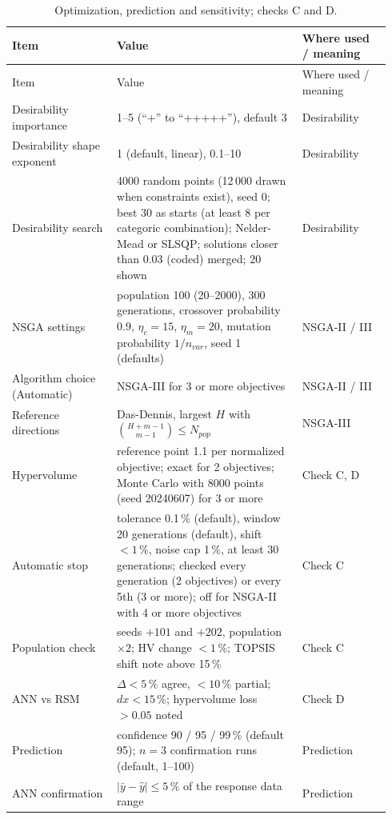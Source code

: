 {\small\begin{longtable}{@{}p{0.26\linewidth}p{0.46\linewidth}p{0.22\linewidth}@{}}
\caption{Optimization, prediction and sensitivity; checks C and D.}\label{tab:a-const-opt}\\
\toprule
Item & Value & Where used / meaning \\
\midrule
\endfirsthead
\toprule
Item & Value & Where used / meaning \\
\midrule
\endhead
\bottomrule
\endfoot
Desirability importance & 1--5 (``+'' to ``+++++''), default 3 & Desirability \\
Desirability shape exponent & 1 (default, linear), 0.1--10 & Desirability \\
Desirability search & 4000 random points (12\,000 drawn when constraints exist), seed 0; best 30 as starts (at
  least 8 per categoric combination); Nelder-Mead or SLSQP; solutions closer than 0.03 (coded) merged; 20 shown &
  Desirability \\
NSGA settings & population 100 (20--2000), 300 generations, crossover probability 0.9, $\eta_c = 15$,
  $\eta_m = 20$, mutation probability $1/n_{var}$, seed 1 (defaults) & NSGA-II / III \\
Algorithm choice (Automatic) & NSGA-III for 3 or more objectives & NSGA-II / III \\
Reference directions & Das-Dennis, largest $H$ with $\binom{H+m-1}{m-1} \le N_{pop}$ & NSGA-III \\
Hypervolume & reference point 1.1 per normalized objective; exact for 2 objectives; Monte Carlo with 8000 points
  (seed 20240607) for 3 or more & Check C, D \\
Automatic stop & tolerance 0.1\,\% (default), window 20 generations (default), shift $< 1\,\%$, noise cap 1\,\%,
  at least 30 generations; checked every generation (2 objectives) or every 5th (3 or more); off for NSGA-II with
  4 or more objectives & Check C \\
Population check & seeds $+101$ and $+202$, population $\times 2$; HV change $< 1\,\%$; TOPSIS shift note above
  15\,\% & Check C \\
ANN vs RSM & $\Delta < 5\,\%$ agree, $< 10\,\%$ partial; $dx < 15\,\%$; hypervolume loss $> 0.05$ noted & Check D \\
Prediction & confidence 90 / 95 / 99\,\% (default 95); $n = 3$ confirmation runs (default, 1--100) & Prediction \\
ANN confirmation & $|\bar y - \hat y| \le 5\,\%$ of the response data range & Prediction \\

\end{longtable}}
